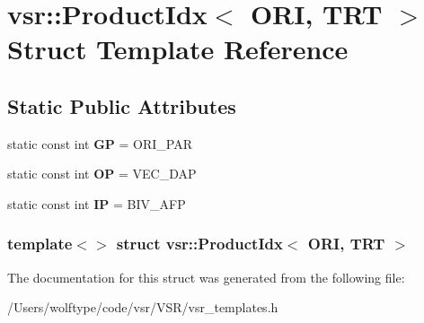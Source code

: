 \hypertarget{structvsr_1_1_product_idx_3_01_o_r_i_00_01_t_r_t_01_4}{\section{vsr\-:\-:Product\-Idx$<$ O\-R\-I, T\-R\-T $>$ Struct Template Reference}
\label{structvsr_1_1_product_idx_3_01_o_r_i_00_01_t_r_t_01_4}
}
\subsection*{Static Public Attributes}
\begin{DoxyCompactItemize}
\item 
\hypertarget{structvsr_1_1_product_idx_3_01_o_r_i_00_01_t_r_t_01_4_ae81918220ced7fbf5fb3a9254534a95b}{static const int {\bfseries G\-P} = O\-R\-I\-\_\-\-P\-A\-R}\label{structvsr_1_1_product_idx_3_01_o_r_i_00_01_t_r_t_01_4_ae81918220ced7fbf5fb3a9254534a95b}

\item 
\hypertarget{structvsr_1_1_product_idx_3_01_o_r_i_00_01_t_r_t_01_4_a8a451d17db1bf29b58d480fad7802ea2}{static const int {\bfseries O\-P} = V\-E\-C\-\_\-\-D\-A\-P}\label{structvsr_1_1_product_idx_3_01_o_r_i_00_01_t_r_t_01_4_a8a451d17db1bf29b58d480fad7802ea2}

\item 
\hypertarget{structvsr_1_1_product_idx_3_01_o_r_i_00_01_t_r_t_01_4_a7a22bf094e74497d56870866d12e7c5c}{static const int {\bfseries I\-P} = B\-I\-V\-\_\-\-A\-F\-P}\label{structvsr_1_1_product_idx_3_01_o_r_i_00_01_t_r_t_01_4_a7a22bf094e74497d56870866d12e7c5c}

\end{DoxyCompactItemize}
\subsubsection*{template$<$$>$ struct vsr\-::\-Product\-Idx$<$ O\-R\-I, T\-R\-T $>$}



The documentation for this struct was generated from the following file\-:\begin{DoxyCompactItemize}
\item 
/\-Users/wolftype/code/vsr/\-V\-S\-R/vsr\-\_\-templates.\-h\end{DoxyCompactItemize}
